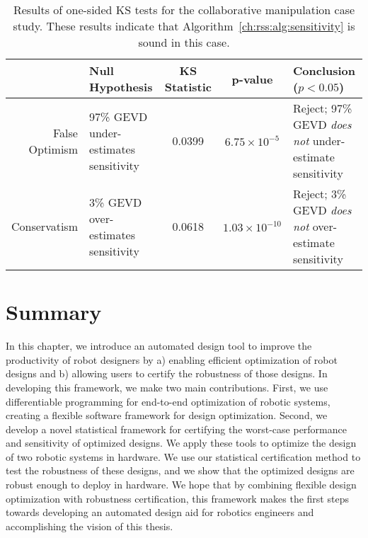 \begin{table}[thb]
    \renewcommand{\arraystretch}{1.5}
    \centering
    \begin{tabular}{r||p{4cm}|c|c|p{5cm}}
                     & Null Hypothesis                     & \shortstack{KS                                                                                       \\ Statistic} & p-value              & Conclusion ($p < 0.05$)                                        \\ \hline\hline
        \shortstack{False                                                                                                                                         \\Optimism} & 97\% GEVD under-estimates sensitivity & 0.0399         & $6.75\times10^{-5}$  & Reject; 97\% GEVD \textit{does not} under-estimate sensitivity \\ \hline
        Conservatism & 3\% GEVD over-estimates sensitivity & 0.0618         & $1.03\times10^{-10}$ & Reject; 3\% GEVD \textit{does not} over-estimate sensitivity
    \end{tabular}
    \caption{Results of one-sided KS tests for the collaborative manipulation case study. These results indicate that Algorithm~\ref{ch:rss:alg:sensitivity} is sound in this case.}\label{ch:rss:tab:ks_test_mam}
\end{table}

\section{Summary}

In this chapter, we introduce an automated design tool to improve the productivity of robot designers by a) enabling efficient optimization of robot designs and b) allowing users to certify the robustness of those designs. In developing this framework, we make two main contributions. First, we use differentiable programming for end-to-end optimization of robotic systems, creating a flexible software framework for design optimization. Second, we develop a novel statistical framework for certifying the worst-case performance and sensitivity of optimized designs.
%
We apply these tools to optimize the design of two robotic systems in hardware. We use our statistical certification method to test the robustness of these designs, and we show that the optimized designs are robust enough to deploy in hardware. We hope that by combining flexible design optimization with robustness certification, this framework makes the first steps towards developing an automated design aid for robotics engineers and accomplishing the vision of this thesis.

